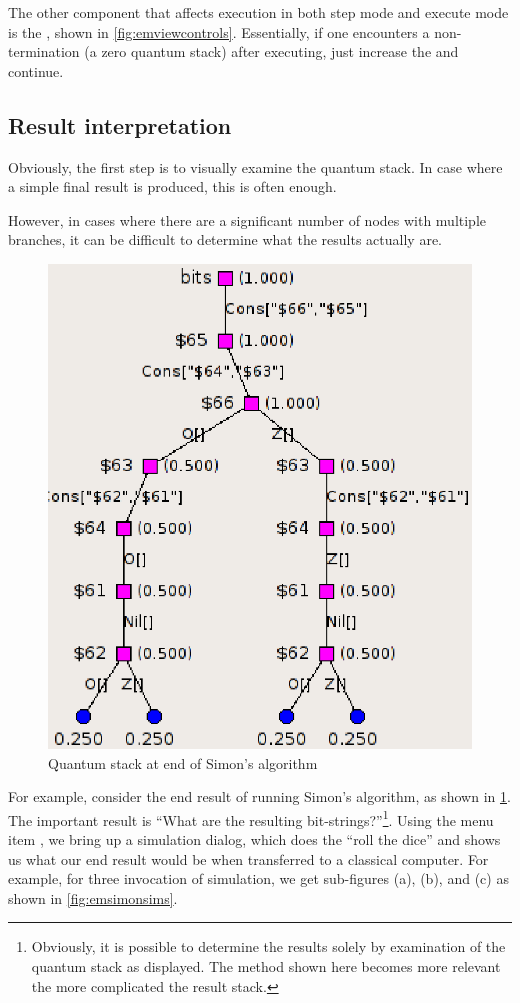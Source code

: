 The other component that affects execution in both  step mode and
execute mode is the , shown
in \ref{fig:emviewcontrols}. Essentially, if one encounters a
non-termination (a zero quantum stack) after executing, just increase the
 and continue.

\subsection{Result interpretation}
Obviously, the first step is to visually examine the quantum stack. In case
where a simple final result is produced, this is often enough.

However, in cases where there are a significant number of nodes with multiple
branches, it can be difficult to determine what the results actually are.

\begin{figure}[htbp]
\centering
\includegraphics[scale=.75]{images/emulator/SimonsResult.eps}
\caption{Quantum stack at end of Simon's algorithm}\label{fig:emsimonsresult}
\end{figure}

For example, consider the end result of running Simon's algorithm, as shown
in \ref{fig:emsimonsresult}. The important result is ``What are the
resulting bit-strings?''\footnote{Obviously, it is possible to determine
the results solely by examination of the quantum stack as displayed. The
method shown here becomes more relevant the more complicated the
result stack.}. Using the menu item , we
bring up a simulation dialog, which does the ``roll the dice'' and
shows us what our end result would be when transferred to a classical
computer. For example, for three invocation of simulation, we
get sub-figures (a), (b), and (c) as shown in \ref{fig:emsimonsims}.

